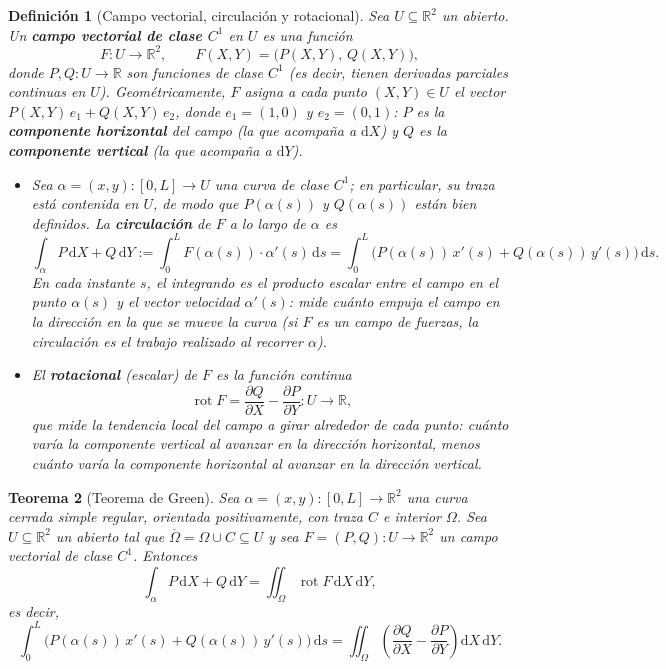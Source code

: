 \documentclass[12pt,a4paper]{article}
\theoremstyle{profesional}
\newtheorem{teorema}{Teorema}[subsection]
\theoremstyle{definicion-style}
\newtheorem{definicion}[teorema]{Definición}
\newcommand{\R}{\mathbb{R}}
\begin{document}
\begin{definicion}[Campo vectorial, circulación y rotacional]\label{def:campo}
    Sea \( U \subseteq \R^2 \) un abierto. Un \textbf{campo vectorial de clase \( C^1 \)} en \( U \) es una función
    \[
        F : U \to \R^2, \qquad F(X, Y) = \big( P(X, Y), \, Q(X, Y) \big),
    \]
    donde \( P, Q : U \to \R \) son funciones de clase \( C^1 \) (es decir, tienen derivadas parciales continuas en \( U \)). Geométricamente, \( F \) asigna a cada punto \( (X, Y) \in U \) el vector \( P(X, Y) \, e_1 + Q(X, Y) \, e_2 \), donde \( e_1 = (1, 0) \) y \( e_2 = (0, 1) \):
    \( P \) es la \textbf{componente horizontal} del campo (la que acompaña a \( \mathrm{d}X \)) y \( Q \) es la \textbf{componente vertical} (la que acompaña a \( \mathrm{d}Y \)).
    \begin{itemize}[leftmargin=2em]
        \item Sea \( \alpha = (x, y) : [0, L] \to U \) una curva de clase \( C^1 \); en particular, su traza está contenida en \( U \), de modo que \( P(\alpha(s)) \) y \( Q(\alpha(s)) \) están bien definidos. La \textbf{circulación} de \( F \) a lo largo de \( \alpha \) es
              \[
                  \int_{\alpha} P \, \mathrm{d}X + Q \, \mathrm{d}Y := \int_0^L F(\alpha(s)) \cdot \alpha'(s) \, \mathrm{d}s = \int_0^L \Big( P(\alpha(s)) \, x'(s) + Q(\alpha(s)) \, y'(s) \Big) \, \mathrm{d}s.
              \]
              En cada instante \( s \), el integrando es el producto escalar entre el campo en el punto \( \alpha(s) \) y el vector velocidad \( \alpha'(s) \): mide cuánto empuja el campo en la dirección en la que se mueve la curva (si \( F \) es un campo de fuerzas, la circulación es el trabajo realizado al recorrer \( \alpha \)).
        \item El \textbf{rotacional} (escalar) de \( F \) es la función continua
              \[
                  \operatorname{rot} F = \frac{\partial Q}{\partial X} - \frac{\partial P}{\partial Y} : U \to \R,
              \]
              que mide la tendencia local del campo a girar alrededor de cada punto: cuánto varía la componente vertical al avanzar en la dirección horizontal, menos cuánto varía la componente horizontal al avanzar en la dirección vertical.
    \end{itemize}
\end{definicion}

\begin{teorema}[Teorema de Green]\label{teo:green}
    Sea \( \alpha = (x, y) : [0, L] \to \R^2 \) una curva cerrada simple regular, orientada positivamente, con traza \( C \) e interior \( \Omega \). Sea \( U \subseteq \R^2 \) un abierto tal que \( \overline{\Omega} = \Omega \cup C \subseteq U \) y sea
    \( F = (P, Q) : U \to \R^2 \) un campo vectorial de clase \( C^1 \). Entonces
    \[
        \int_{\alpha} P \, \mathrm{d}X + Q \, \mathrm{d}Y = \iint_{\Omega} \operatorname{rot} F \, \mathrm{d}X \, \mathrm{d}Y,
    \]
    es decir,
    \[
        \int_0^L \Big( P(\alpha(s)) \, x'(s) + Q(\alpha(s)) \, y'(s) \Big) \, \mathrm{d}s = \iint_{\Omega} \left( \frac{\partial Q}{\partial X} - \frac{\partial P}{\partial Y} \right) \mathrm{d}X \, \mathrm{d}Y.
    \]
\end{teorema}
\end{document}
